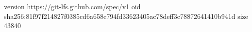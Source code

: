 version https://git-lfs.github.com/spec/v1
oid sha256:81f97f214827f0385cd6a658c794fd33623405ac78deff3c78872641410b941d
size 43840
